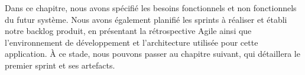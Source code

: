 Dans ce chapitre, nous avons spécifié les besoins fonctionnels et non fonctionnels du futur système. Nous avons également planifié les sprints à réaliser et établi notre backlog produit, en présentant la rétrospective Agile ainsi que l’environnement de développement et l’architecture utilisée pour cette application. À ce stade, nous pouvons passer au chapitre suivant, qui détaillera le premier sprint et ses artefacts.